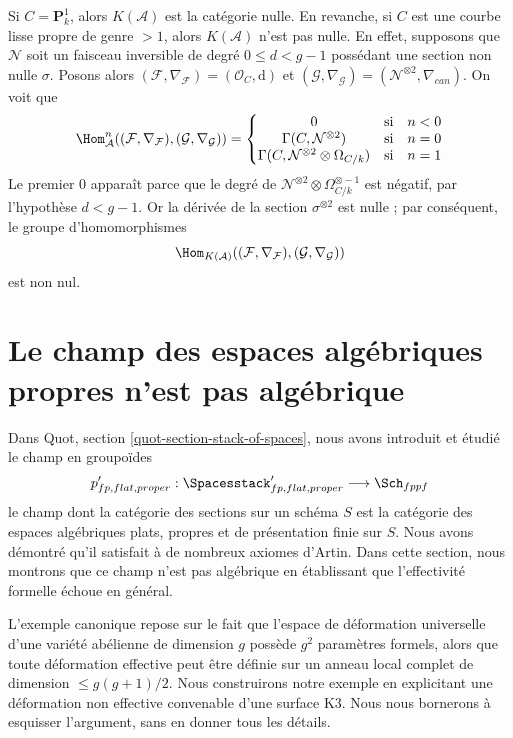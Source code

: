 \medskip\noindent
Si $C = \mathbf{P}^1_k$, alors $K(\mathcal{A})$ est la catégorie nulle.
En revanche, si $C$ est une courbe lisse propre de genre $> 1$, alors
$K(\mathcal{A})$ n'est pas nulle. En effet, supposons que $\mathcal{N}$
soit un faisceau inversible
de degré $0 \leq d < g - 1$
possédant une section non nulle $\sigma$. Posons alors
$(\mathcal{F}, \nabla_\mathcal{F}) = (\mathcal{O}_C, \text{d})$
et
$(\mathcal{G}, \nabla_\mathcal{G}) = (\mathcal{N}^{\otimes 2}, \nabla_{can})$.
On voit que
$$
\Hom_\mathcal{A}^n((\mathcal{F}, \nabla_\mathcal{F}),
(\mathcal{G}, \nabla_\mathcal{G})) =
\left\{
\begin{matrix}
0 & \text{si} & n < 0 \\
\Gamma(C, \mathcal{N}^{\otimes 2}) & \text{si} & n = 0 \\
\Gamma(C, \mathcal{N}^{\otimes 2} \otimes \Omega_{C/k}) & \text{si} & n = 1
\end{matrix}
\right.
$$
Le premier $0$ apparaît
parce que le degré de
$\mathcal{N}^{\otimes 2} \otimes \Omega_{C/k}^{\otimes -1}$
est négatif, par l'hypothèse $d < g - 1$. Or la dérivée de la section
$\sigma^{\otimes 2}$ est nulle ; par conséquent, le groupe d'homomorphismes
$$
\Hom_{K(\mathcal{A})}((\mathcal{F}, \nabla_\mathcal{F}),
(\mathcal{G}, \nabla_\mathcal{G}))
$$
est non nul.






\section{Le champ des espaces algébriques propres n'est pas algébrique}
\label{section-proper-spaces-not-algebraic}

\noindent
Dans Quot, section \ref{quot-section-stack-of-spaces}, nous avons
introduit et étudié le champ en groupoïdes
$$
p'_{fp, flat, proper} :
\Spacesstack'_{fp, flat, proper}
\longrightarrow
\Sch_{fppf}
$$
le champ dont la catégorie des sections sur un schéma $S$
est la catégorie des espaces algébriques plats, propres et de présentation
finie sur $S$. Nous avons démontré qu'il satisfait à de nombreux
axiomes d'Artin. Dans cette section, nous montrons que ce champ
n'est pas algébrique en établissant que l'effectivité formelle
échoue en général.

\medskip\noindent
L'exemple canonique repose sur le fait que l'espace de déformation universelle
d'une variété abélienne de dimension $g$ possède $g^2$ paramètres formels,
alors que toute déformation effective peut être définie sur un
anneau local complet de dimension $\leq g(g + 1)/2$.
Nous construirons notre exemple en explicitant une
déformation non effective convenable d'une surface K3.
Nous nous bornerons à esquisser l'argument, sans en donner tous les détails.

